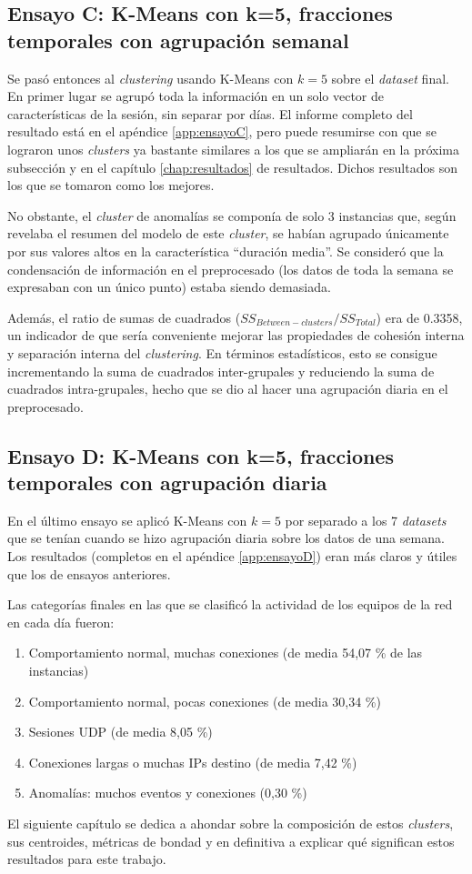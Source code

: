 \subsection{Ensayo C: K-Means con k=5, fracciones temporales con agrupación semanal}\label{subsec:ensayoC}

Se pasó entonces al \emph{clustering} usando K-Means con $k=5$ sobre el \emph{dataset} final.
En primer lugar se agrupó toda la información en un solo vector de características de la sesión, sin separar por días.
El informe completo del resultado está en el apéndice \ref{app:ensayoC},
pero puede resumirse con que se lograron unos \emph{clusters} ya bastante similares a los que se ampliarán en la próxima subsección y en el capítulo \ref{chap:resultados} de resultados.
Dichos resultados son los que se tomaron como los mejores.

No obstante, el \emph{cluster} de anomalías se componía de solo 3 instancias que,
según revelaba el resumen del modelo de este \emph{cluster}, se habían agrupado únicamente por sus valores altos en la característica ``duración media''.
Se consideró que la condensación de información en el preprocesado (los datos de toda la semana se expresaban con un único punto) estaba siendo demasiada.

Además, el ratio de sumas de cuadrados ($SS_{Between-clusters} / SS_{Total}$) era de 0.3358,
un indicador de que sería conveniente mejorar las propiedades de cohesión interna y separación interna del \emph{clustering}.
En términos estadísticos, esto se consigue incrementando la suma de cuadrados inter-grupales y reduciendo la suma de cuadrados intra-grupales,
hecho que se dio al hacer una agrupación diaria en el preprocesado.

\subsection{Ensayo D: K-Means con k=5, fracciones temporales con agrupación diaria}\label{subsec:ensayoD}

En el último ensayo se aplicó K-Means con $k=5$ por separado a los 7 \emph{datasets} que se tenían cuando se hizo agrupación diaria sobre los datos de una semana.
Los resultados (completos en el apéndice \ref{app:ensayoD}) eran más claros y útiles que los de ensayos anteriores.

Las categorías finales en las que se clasificó la actividad de los equipos de la red en cada día fueron:
\begin{enumerate}
    \item Comportamiento normal, muchas conexiones (de media 54,07 \% de las instancias)
    \item Comportamiento normal, pocas conexiones (de media 30,34 \%)
    \item Sesiones UDP (de media 8,05 \%)
    \item Conexiones largas o muchas IPs destino (de media 7,42 \%)
    \item Anomalías: muchos eventos y conexiones (0,30 \%)
\end{enumerate}

El siguiente capítulo se dedica a ahondar sobre la composición de estos \emph{clusters}, sus centroides, métricas de bondad y en definitiva a explicar qué significan estos resultados para este trabajo.
